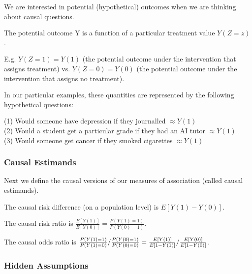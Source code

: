 We are interested in potential (hypothetical) outcomes when we are thinking about causal questions.

\begin{definition}
    The potential outcome Y is a function of a particular treatment value $Y(Z=z)$.
\end{definition}

E.g. $Y(Z=1) = Y(1)$ (the potential outcome under the intervention that assigns treatment) vs. $Y(Z=0) = Y(0)$ (the potential outcome under the intervention that assigns no treatment).

In our particular examples, these quantities are represented by the following hypothetical questions: \par

(1) Would someone have depression if they journalled $\approx Y(1)$ \\
(2) Would a  student get a particular grade if they had an AI tutor $\approx Y(1)$ \\
(3) Would someone get cancer if they smoked cigarettes $\approx Y(1)$

\subsubsection{Causal Estimands}

Next we define the causal versions of our measures of association (called  causal estimands).

\begin{definition}
    The causal risk difference (on a population level) is $E[Y(1) - Y(0)]$.
\end{definition}

\begin{definition}
    The causal risk ratio is $\frac{E[Y(1)]}{E[Y(0)]} = \frac{P(Y(1) = 1)}{P(Y(0) = 1)}$.
\end{definition}

\begin{definition}
    The causal odds ratio is $\frac{P(Y(1) = 1)}{P(Y(1) = 0)}/\frac{P(Y(0) = 1)}{P(Y(0) = 0)} = \\ 
    \frac{E[Y(1)]}{E[1-Y(1)]}/\frac{E[Y(0)]}{E[1-Y(0)]}$.
\end{definition}

\subsubsection{Hidden Assumptions}

